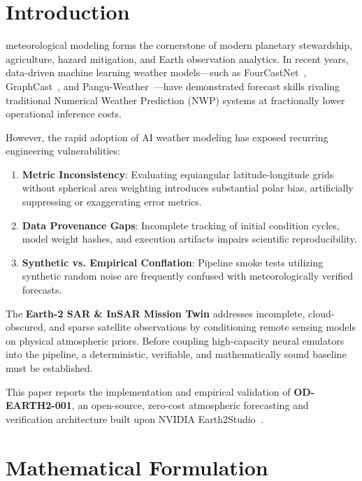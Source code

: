 \documentclass[10pt,journal,compsoc]{IEEEtran}
\begin{document}
\maketitle
\IEEEdisplaynontitleabstractindextext
\IEEEpeerreviewmaketitle

\section{Introduction}
 meteorological modeling forms the cornerstone of modern planetary stewardship, agriculture, hazard mitigation, and Earth observation analytics. In recent years, data-driven machine learning weather models---such as FourCastNet~\cite{pathak2022fourcastnet}, GraphCast~\cite{lam2023learning}, and Pangu-Weather~\cite{bi2023accurate}---have demonstrated forecast skills rivaling traditional Numerical Weather Prediction (NWP) systems at fractionally lower operational inference costs.

However, the rapid adoption of AI weather modeling has exposed recurring engineering vulnerabilities:
\begin{enumerate}
    \item \textbf{Metric Inconsistency}: Evaluating equiangular latitude-longitude grids without spherical area weighting introduces substantial polar bias, artificially suppressing or exaggerating error metrics.
    \item \textbf{Data Provenance Gaps}: Incomplete tracking of initial condition cycles, model weight hashes, and execution artifacts impairs scientific reproducibility.
    \item \textbf{Synthetic vs. Empirical Conflation}: Pipeline smoke tests utilizing synthetic random noise are frequently confused with meteorologically verified forecasts.
\end{enumerate}

The \textbf{Earth-2 SAR \& InSAR Mission Twin} addresses incomplete, cloud-obscured, and sparse satellite observations by conditioning remote sensing models on physical atmospheric priors. Before coupling high-capacity neural emulators into the pipeline, a deterministic, verifiable, and mathematically sound baseline must be established.

This paper reports the implementation and empirical validation of \textbf{OD-EARTH2-001}, an open-source, zero-cost atmospheric forecasting and verification architecture built upon NVIDIA Earth2Studio~\cite{earth2studio2024}.

\section{Mathematical Formulation}
\end{document}
